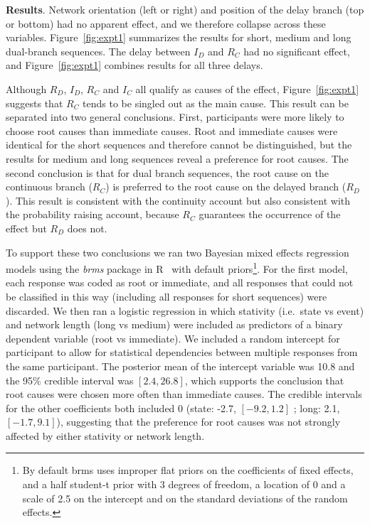 \documentclass[10pt,letterpaper]{article}
\newcommand{\ev}[2]{$#1_#2$}
\begin{document}
\textbf{Results}. 
Network orientation (left or right) and position of the delay branch (top or bottom) had no apparent effect, and we therefore collapse across these variables. Figure~\ref{fig:expt1} summarizes the results for short, medium and long dual-branch sequences. The delay between \ev{I}{D} and \ev{R}{C} had no significant effect, and Figure~\ref{fig:expt1} combines results for all three delays.  

Although \ev{R}{D}, \ev{I}{D}, \ev{R}{C} and \ev{I}{C} all qualify as causes of the effect, Figure~\ref{fig:expt1} suggests that \ev{R}{C} tends to be singled out as the main cause. This result can be separated into two general conclusions.  First,  participants were more likely to choose root causes than immediate causes. Root and immediate causes were identical for the short sequences and therefore cannot be distinguished, but the results for medium and long sequences reveal a preference for root causes.  The second conclusion is that for dual branch sequences, the root cause on the continuous branch (\ev{R}{C}) is preferred to the root cause on the delayed branch (\ev{R}{D}). This result is consistent with the continuity account but also consistent with the probability raising account, because \ev{R}{C} guarantees the occurrence of the effect but \ev{R}{D} does not. 

To support these two conclusions we ran two Bayesian mixed effects regression models using the \emph{brms} package in R~\cite{brms} with default priors\footnote{By default brms uses improper flat priors on the coefficients of fixed effects, and a half student-t prior with 3 degrees of freedom, a location of 0 and a scale of 2.5 on the intercept and on the standard deviations of the random effects.}. For the first model, each response was coded as root or immediate, and all responses that could not be classified in this way (including all responses for short sequences) were discarded. We then ran a logistic regression in which stativity (i.e.\ state vs event) and network length (long vs medium) were included as predictors of a binary dependent variable (root vs immediate). We included a random intercept for participant to allow for statistical dependencies between multiple responses from the same participant. The posterior mean of the intercept variable was 10.8 and the 95\% credible interval was $[2.4, 26.8]$, which supports the conclusion that root causes were chosen more often than immediate causes. The credible intervals for the other coefficients both included 0 (state: -2.7, $[-9.2, 1.2]$ ; long: 2.1, $[-1.7, 9.1]$), suggesting that the preference for root causes was not strongly affected by either stativity or network length. 
\end{document}
